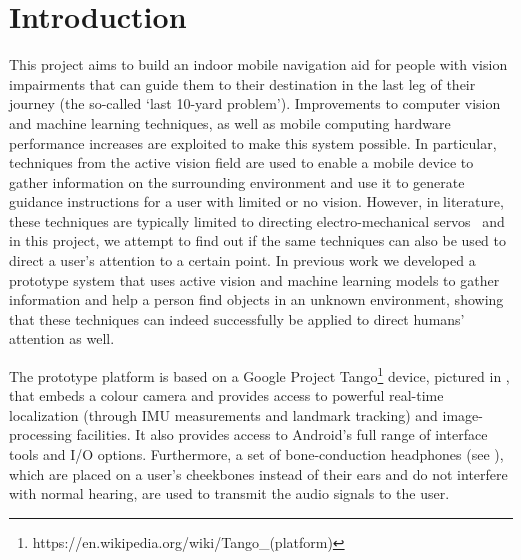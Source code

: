 \documentclass[acmsmall]{acmart}
\begin{document}


\maketitle

\section{Introduction}

This project aims to build an indoor mobile navigation aid for people with vision impairments that can guide them to their destination in the last leg of their journey (the so-called `last 10-yard problem').
Improvements to computer vision and machine learning techniques, as well as mobile computing hardware performance increases are exploited to make this system possible.
In particular, techniques from the active vision field are used to enable a mobile device to gather information on the surrounding environment and use it to generate guidance instructions for a user with limited or no vision.
However, in literature, these techniques are typically limited to directing electro-mechanical servos~\citep{bajcsy2018revisiting} and in this project, we attempt to find out if the same techniques can also be used to direct a user's attention to a certain point. 
In previous work we developed a prototype system that uses active vision and machine learning models to gather information and help a person find objects in an unknown environment, showing that these techniques can indeed successfully be applied to direct humans' attention as well\citep{lock2019active}.

The prototype platform is based on a Google Project Tango\footnote{https://en.wikipedia.org/wiki/Tango\_(platform)} device, pictured in , that embeds a colour camera and provides access to powerful real-time localization (through IMU measurements and landmark tracking) and image-processing facilities. 
It also provides access to Android's full range of interface tools and I/O options. 
Furthermore, a set of bone-conduction headphones (see ), which are placed on a user's cheekbones instead of their ears and do not interfere with normal hearing, are used to transmit the audio signals to the user.
\end{document}
